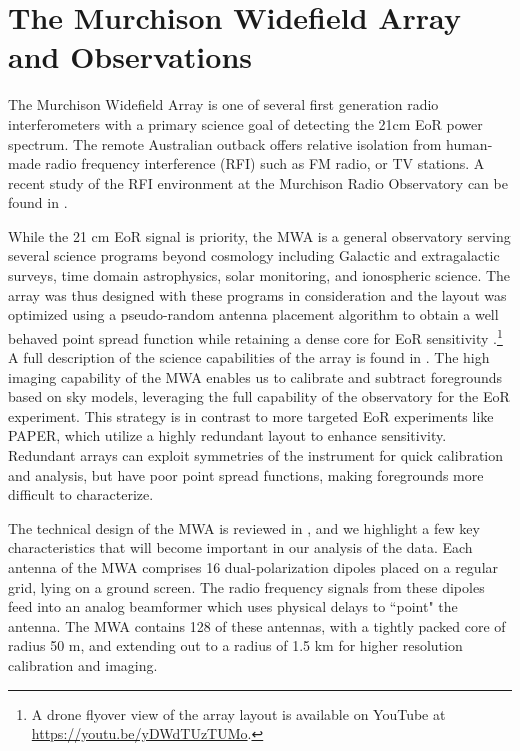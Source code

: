 \documentclass[iop]{emulateapj}
\begin{document}
\section{The Murchison Widefield Array and Observations}\label{sec:MWA}
The Murchison Widefield Array is one of several first generation radio interferometers with 
a primary science goal of detecting the 21cm EoR power spectrum. The remote Australian 
outback offers relative isolation from human-made radio frequency interference (RFI) such as 
FM radio, or TV stations. A recent study of the RFI environment at the Murchison Radio 
Observatory can be found in \citealt{Offringa:2015}.

While the 21 cm EoR signal is priority, the MWA is a general observatory serving several 
science programs beyond cosmology including Galactic and extragalactic surveys, time 
domain astrophysics, solar monitoring, and ionospheric science. The array was thus 
designed with these programs in consideration and the layout was optimized using a 
pseudo-random antenna placement algorithm \citep{Beardsley:2012} to obtain a well 
behaved point spread function while retaining a dense core for EoR sensitivity 
\citep{Beardsley:2013, Bowman:2006}.\footnote{A drone flyover view of the array layout is available on YouTube at \url{https://youtu.be/yDWdTUzTUMo}.}
A full description of the science capabilities of the array is found in
\citealt{Bowman:2013}.
The high imaging capability of the MWA enables us to calibrate and subtract foregrounds
based on sky models, leveraging the full capability of the observatory for the
EoR experiment. 
This strategy is in contrast to more targeted EoR experiments like PAPER, 
which utilize a highly redundant layout to enhance sensitivity. Redundant arrays can 
exploit symmetries of the instrument for quick calibration and analysis, but have poor 
point spread functions, making foregrounds more difficult to characterize.

The technical design of the MWA is reviewed in \citealt{Tingay:2013}, and we highlight a 
few key characteristics that will become important in our analysis of the data. Each 
antenna of the MWA comprises 16 dual-polarization dipoles placed on a regular grid, lying 
on a ground screen. The radio frequency signals from these dipoles feed into an analog 
beamformer which uses physical delays to ``point" the antenna. The MWA contains 128 of 
these antennas, with a tightly packed core of radius 50 m, and extending out to a radius of
1.5 km for higher resolution calibration and imaging.
\end{document}
